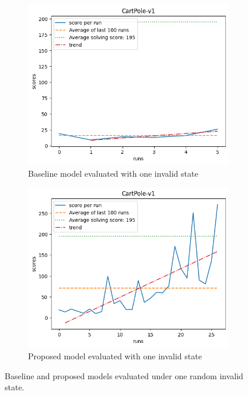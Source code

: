 \documentclass[acmsmall,review,authorversion]{acmart}
\begin{document}
    \begin{figure}[hbt]
        \centering
        \begin{subfigure}{.5\textwidth}
          \centering
          \includegraphics[width=.8\linewidth]{assets/baseline_invalid.png}
          \caption{Baseline model evaluated with one invalid state}
          \label{fig:baseline_invalid}
        \end{subfigure}%
        \begin{subfigure}{.5\textwidth}
          \centering
          \includegraphics[width=.8\linewidth]{assets/backtrack_invalid.png}
          \caption{Proposed model evaluated with one invalid state}
          \label{fig:proposed_invalid}
        \end{subfigure}
        \captionsetup{justification=centering}
        \caption{Baseline and proposed models evaluated under one random invalid state.}
        \label{fig:invalid_state}
    \end{figure}
\end{document}
